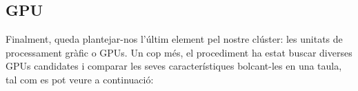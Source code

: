 \subsection{GPU}

Finalment, queda plantejar-nos l'últim element pel nostre clúster: les unitats de processament gràfic o GPUs. Un cop més, el procediment ha estat buscar diverses GPUs candidates i comparar les seves característiques bolcant-les en una taula, tal com es pot veure a continuació:

\begin{table}[H]
\begin{adjustwidth}{-1.0in}{-1.0in}  
    \begin{center}
    \centering
\end{center}
\end{adjustwidth}
\end{table}
